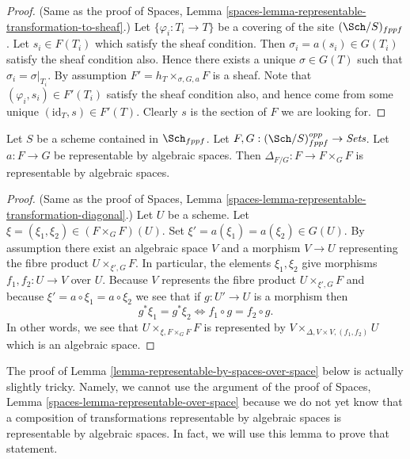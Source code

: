 \begin{proof}
(Same as the proof of
Spaces, Lemma \ref{spaces-lemma-representable-transformation-to-sheaf}.)
Let $\{\varphi_i : T_i \to T\}$ be a covering of the site
$(\Sch/S)_{fppf}$.
Let $s_i \in F(T_i)$ which satisfy the sheaf condition.
Then $\sigma_i = a(s_i) \in G(T_i)$ satisfy the sheaf condition
also. Hence there exists a unique $\sigma \in G(T)$ such
that $\sigma_i = \sigma|_{T_i}$. By assumption
$F' = h_T \times_{\sigma, G, a} F$ is a sheaf.
Note that $(\varphi_i, s_i) \in F'(T_i)$ satisfy the
sheaf condition also, and hence come from some unique
$(\text{id}_T, s) \in F'(T)$. Clearly $s$ is the section of
$F$ we are looking for.
\end{proof}

\begin{lemma}
\label{lemma-representable-by-spaces-transformation-diagonal}
Let $S$ be a scheme contained in $\Sch_{fppf}$.
Let $F, G : (\Sch/S)_{fppf}^{opp} \to \textit{Sets}$.
Let $a : F \to G$ be representable by algebraic spaces.
Then $\Delta_{F/G} : F \to F \times_G F$ is representable by
algebraic spaces.
\end{lemma}

\begin{proof}
(Same as the proof of
Spaces, Lemma \ref{spaces-lemma-representable-transformation-diagonal}.)
Let $U$ be a scheme. Let $\xi = (\xi_1, \xi_2) \in (F \times_G F)(U)$.
Set $\xi' = a(\xi_1) = a(\xi_2) \in G(U)$.
By assumption there exist an algebraic space $V$ and a morphism $V \to U$
representing the fibre product $U \times_{\xi', G} F$.
In particular, the elements $\xi_1, \xi_2$ give morphisms
$f_1, f_2 : U \to V$ over $U$. Because $V$ represents the
fibre product $U \times_{\xi', G} F$ and because
$\xi' = a \circ \xi_1 = a \circ \xi_2$
we see that if $g : U' \to U$ is a morphism then
$$
g^*\xi_1 = g^*\xi_2
\Leftrightarrow
f_1 \circ g = f_2 \circ g.
$$
In other words, we see that $U \times_{\xi, F \times_G F} F$
is represented by $V \times_{\Delta, V \times V, (f_1, f_2)} U$
which is an algebraic space.
\end{proof}

\noindent
The proof of
Lemma \ref{lemma-representable-by-spaces-over-space}
below is actually slightly tricky. Namely,
we cannot use the argument of the proof of
Spaces, Lemma \ref{spaces-lemma-representable-over-space}
because we do not yet know that a composition of transformations
representable by algebraic spaces is representable by algebraic
spaces. In fact, we will use this lemma to prove that statement.

